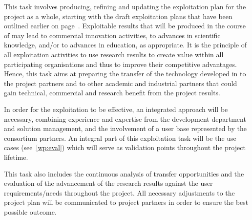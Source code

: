 \begin{Workpackage}{\thewpno}
\begin{Task}

\TaskHeader{}


This task involves producing, refining and updating the exploitation plan for the project as a whole, starting with the draft exploitation plans that have been outlined earlier on page~\pageref{sect:exploitation-plan}.
Exploitable results that will be produced in the course of \TheProject may lead to commercial innovation activities, to advances in scientific knowledge, and/or to advances in education, as appropriate.
It is the principle of all exploitation activities to use research results to create value within all participating organisations and thus to improve their competitive advantages.
Hence, this task aims at preparing the transfer of the technology developed in \TheProject{} to the project partners and to other academic and industrial partners that could gain technical, commercial and research benefit from the project results.

In order for the exploitation to be effective, an integrated approach will be necessary, combining experience and expertise from the development department and solution management, and the involvement of a user base represented by the consortium partners.
An integral part of this exploitation task will be the \TheProject{} use cases (see~\ref{wp:eval}) which will serve as validation points throughout the project lifetime.

This task also includes the continuous analysis of transfer opportunities and the evaluation of the advancement of the research results against the user requirements/needs throughout the project.
All necessary adjustments to the project plan will be communicated to project partners  in order to ensure the best possible outcome.
\end{Task}

\begin{Task}
\TaskResults{%
\ref{del:dissemplan1};
\ref{del:dissemplan2}
}
\TaskHeader{}


\end{Task}
\end{Workpackage}

